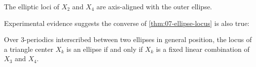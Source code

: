  
\begin{observation}\label{obs:X2X4}
The elliptic loci of $X_2$ and $X_4$ are axis-aligned with the outer ellipse.
\end{observation} 


Experimental evidence suggests the converse of \cref{thm:07-ellipse-locus} is also true:

\begin{conjecture}
Over 3-periodics interscribed between two ellipses in general position, the locus of a triangle center $X_k$ is an ellipse if and only if $X_k$ is a fixed linear combination of $X_3$ and $X_4$.
\label{conj:07-locus}
\end{conjecture}

